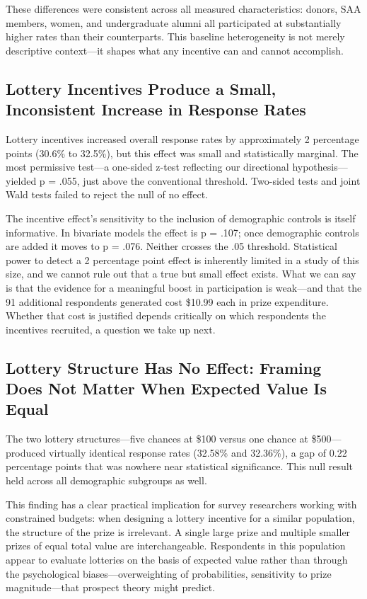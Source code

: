 \documentclass[12pt]{article}
\begin{document}
These differences were consistent across all measured characteristics: donors, SAA members, women, and undergraduate alumni all participated at substantially higher rates than their counterparts. This baseline heterogeneity is not merely descriptive context---it shapes what any incentive can and cannot accomplish.

\subsection{Lottery Incentives Produce a Small, Inconsistent Increase in Response Rates}

Lottery incentives increased overall response rates by approximately 2 percentage points (30.6\% to 32.5\%), but this effect was small and statistically marginal. The most permissive test---a one-sided z-test reflecting our directional hypothesis---yielded p = .055, just above the conventional threshold. Two-sided tests and joint Wald tests failed to reject the null of no effect.

The incentive effect's sensitivity to the inclusion of demographic controls is itself informative. In bivariate models the effect is p = .107; once demographic controls are added it moves to p = .076. Neither crosses the .05 threshold. Statistical power to detect a 2 percentage point effect is inherently limited in a study of this size, and we cannot rule out that a true but small effect exists. What we can say is that the evidence for a meaningful boost in participation is weak---and that the 91 additional respondents generated cost \$10.99 each in prize expenditure. Whether that cost is justified depends critically on which respondents the incentives recruited, a question we take up next.

\subsection{Lottery Structure Has No Effect: Framing Does Not Matter When Expected Value Is Equal}

The two lottery structures---five chances at \$100 versus one chance at \$500---produced virtually identical response rates (32.58\% and 32.36\%), a gap of 0.22 percentage points that was nowhere near statistical significance. This null result held across all demographic subgroups as well.

This finding has a clear practical implication for survey researchers working with constrained budgets: when designing a lottery incentive for a similar population, the structure of the prize is irrelevant. A single large prize and multiple smaller prizes of equal total value are interchangeable. Respondents in this population appear to evaluate lotteries on the basis of expected value rather than through the psychological biases---overweighting of probabilities, sensitivity to prize magnitude---that prospect theory might predict.
\end{document}

